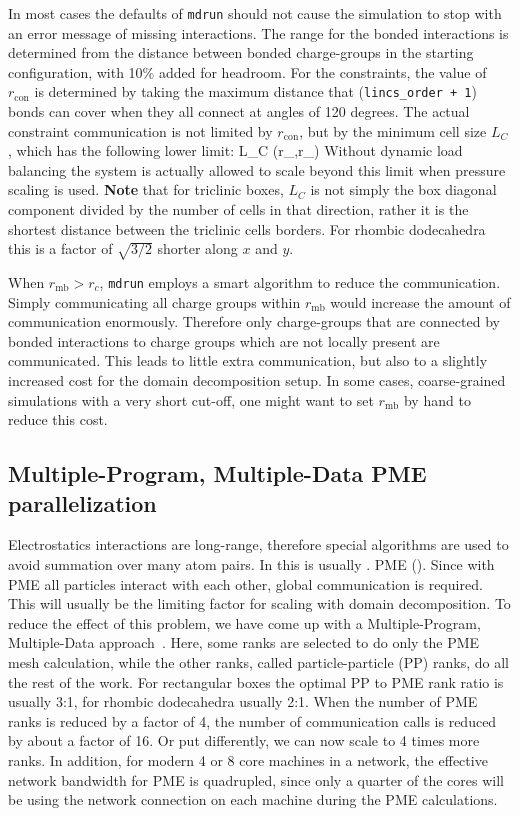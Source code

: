In most cases the defaults of {\tt mdrun} should not cause the simulation
to stop with an error message of missing interactions.
The range for the bonded interactions is determined from the distance
between bonded charge-groups in the starting configuration, with 10\% added
for headroom. For the constraints, the value of $r_{\mathrm{con}}$ is determined by
taking the maximum distance that ({\tt lincs_order + 1}) bonds can cover
when they all connect at angles of 120 degrees.
The actual constraint communication is not limited by $r_{\mathrm{con}}$,
but by the minimum cell size $L_C$, which has the following lower limit:
\beq
L_C \geq \max(r_{},r_{})
\eeq
Without dynamic load balancing the system is actually allowed to scale
beyond this limit when pressure scaling is used.
{\bf Note} that for triclinic boxes, $L_C$ is not simply the box diagonal
component divided by the number of cells in that direction,
rather it is the shortest distance between the triclinic cells borders.
For rhombic dodecahedra this is a factor of $\sqrt{3/2}$ shorter
along $x$ and $y$.

When $r_{\mathrm{mb}} > r_c$, {\tt mdrun} employs a smart algorithm to reduce
the communication. Simply communicating all charge groups within
$r_{\mathrm{mb}}$ would increase the amount of communication enormously.
Therefore only charge-groups that are connected by bonded interactions
to charge groups which are not locally present are communicated.
This leads to little extra communication, but also to a slightly
increased cost for the domain decomposition setup.
In some cases, {\eg} coarse-grained simulations with a very short cut-off,
one might want to set $r_{\mathrm{mb}}$ by hand to reduce this cost.

\subsection{Multiple-Program, Multiple-Data PME parallelization}
\label{subsec:mpmd_pme}
Electrostatics interactions are long-range, therefore special
algorithms are used to avoid summation over many atom pairs.
In {\gromacs} this is usually
{.}
{PME ().}
Since with PME all particles interact with each other, global communication
is required. This will usually be the limiting factor for 
scaling with domain decomposition.
To reduce the effect of this problem, we have come up with
a Multiple-Program, Multiple-Data approach~\cite{Hess2008b}.
Here, some ranks are selected to do only the PME mesh calculation,
while the other ranks, called particle-particle (PP) ranks,
do all the rest of the work.
For rectangular boxes the optimal PP to PME rank ratio is usually 3:1,
for rhombic dodecahedra usually 2:1.
When the number of PME ranks is reduced by a factor of 4, the number
of communication calls is reduced by about a factor of 16.
Or put differently, we can now scale to 4 times more ranks.
In addition, for modern 4 or 8 core machines in a network,
the effective network bandwidth for PME is quadrupled,
since only a quarter of the cores will be using the network connection
on each machine during the PME calculations.

